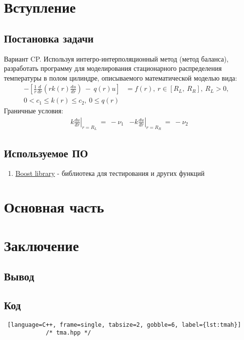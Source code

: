 \documentclass[a4paper,12pt]{article}
\begin{document}
	
	\newpage
	\tableofcontents
	\newpage

	\section{Вступление}
	\subsection{Постановка задачи}

	Вариант CP. Используя интегро-интерполяционный метод (метод баланса), разработать программу для моделирования стационарного распределения температуры в полом цилиндре, описываемого математической моделью вида:
	\begin{align*}
		-\left[ \frac{1}{r} \frac{d}{dr} \left(r k(r)\frac{du}{dr} \right)\ -\ q(r)u \right]
		&= f(r),\ r \in \left[ R_L,\ R_R\right],\ R_L > 0,
		\\
		 0 < c_1 \leq k(r) \leq c_2,\ 0 \leq q(r)&
	\end{align*}
	Граничные условия: \newline
	\begin{align*}
		&k \left. \frac{du}{dr}\right\vert_{r = R_L}\ =\ -\nu _1
		&-k \left. \frac{du}{dr}\right\vert_{r = R_R}\ =\ -\nu_2
	\end{align*}
	\subsection{Используемое ПО}

	\begin{enumerate}
		\item \href{https://www.boost.org/}{Boost library} - библиотека для тестирования и других функций
	\end{enumerate}
	\newpage

	\section{Основная часть}
	

	
	\newpage

	
	\newpage

	\section{Заключение}
	\subsection{Вывод}
	\subsection{Код}
	\begin{footnotesize}
		\begin{lstlisting} [language=C++, frame=single, tabsize=2, gobble=6, label={lst:tmah}]
			/* tma.hpp */
		\end{lstlisting}
	\end{footnotesize}
\end{document}
